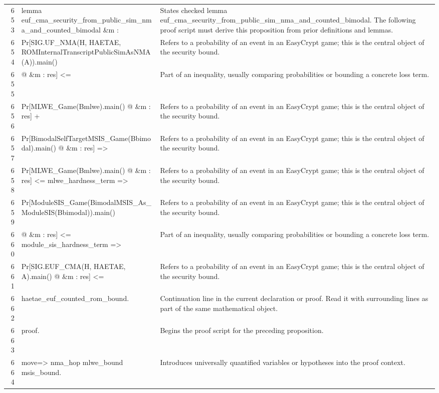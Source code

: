 \documentclass[10pt]{article}
\begin{document}
\begin{longtable}{r L{0.53\textwidth} L{0.37\textwidth}}
653 & {\ttfamily\scriptsize lemma euf\_cma\_security\_from\_public\_sim\_nma\_and\_counted\_bimodal \&m :} & States checked lemma euf\_cma\_security\_from\_public\_sim\_nma\_and\_counted\_bimodal.  The following proof script must derive this proposition from prior definitions and lemmas. \\
654 & {\ttfamily\scriptsize   Pr[SIG.UF\_NMA(H, HAETAE, ROMInternalTranscriptPublicSimAsNMA(A)).main()} & Refers to a probability of an event in an EasyCrypt game; this is the central object of the security bound. \\
655 & {\ttfamily\scriptsize        @ \&m : res] <=} & Part of an inequality, usually comparing probabilities or bounding a concrete loss term. \\
656 & {\ttfamily\scriptsize     Pr[MLWE\_Game(Bmlwe).main() @ \&m : res] +} & Refers to a probability of an event in an EasyCrypt game; this is the central object of the security bound. \\
657 & {\ttfamily\scriptsize     Pr[BimodalSelfTargetMSIS\_Game(Bbimodal).main() @ \&m : res] =>} & Refers to a probability of an event in an EasyCrypt game; this is the central object of the security bound. \\
658 & {\ttfamily\scriptsize   Pr[MLWE\_Game(Bmlwe).main() @ \&m : res] <= mlwe\_hardness\_term =>} & Refers to a probability of an event in an EasyCrypt game; this is the central object of the security bound. \\
659 & {\ttfamily\scriptsize   Pr[ModuleSIS\_Game(BimodalMSIS\_As\_ModuleSIS(Bbimodal)).main()} & Refers to a probability of an event in an EasyCrypt game; this is the central object of the security bound. \\
660 & {\ttfamily\scriptsize        @ \&m : res] <= module\_sis\_hardness\_term =>} & Part of an inequality, usually comparing probabilities or bounding a concrete loss term. \\
661 & {\ttfamily\scriptsize   Pr[SIG.EUF\_CMA(H, HAETAE, A).main() @ \&m : res] <=} & Refers to a probability of an event in an EasyCrypt game; this is the central object of the security bound. \\
662 & {\ttfamily\scriptsize     haetae\_euf\_counted\_rom\_bound.} & Continuation line in the current declaration or proof.  Read it with surrounding lines as part of the same mathematical object. \\
663 & {\ttfamily\scriptsize proof.} & Begins the proof script for the preceding proposition. \\
664 & {\ttfamily\scriptsize move=> nma\_hop mlwe\_bound msis\_bound.} & Introduces universally quantified variables or hypotheses into the proof context. \\

\end{longtable}
\end{document}
